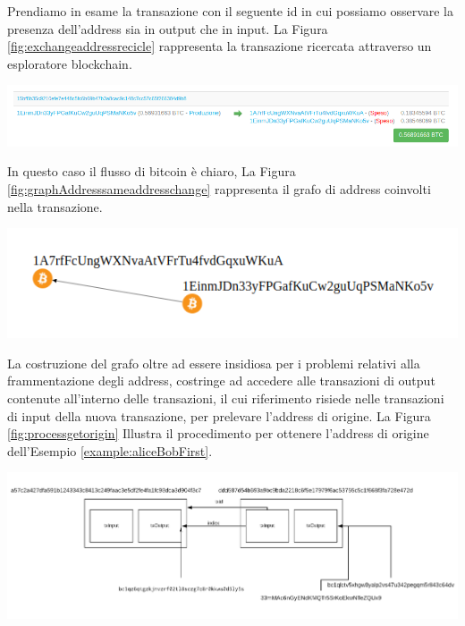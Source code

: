 \begin{example}
  Prendiamo in esame la transazione con il seguente id  in cui possiamo osservare la presenza dell’address  sia in output che in input.
  La Figura \ref{fig:exchangeaddressrecicle} rappresenta la transazione ricercata attraverso un esploratore blockchain.

  {\centering
  \vspace{15pt}
  \includegraphics[scale=0.35]{images/exampleWithGraph/exchange-tx-with-same-address.png}
  \vspace{5pt}
  \par}

  In questo caso il flusso di bitcoin è chiaro, La Figura \ref{fig:graphAddresssameaddresschange} rappresenta il grafo di address coinvolti nella transazione.

    {\centering
  \vspace{15pt}
  \includegraphics[scale=0.48]{images/exampleWithGraph/exchange-tx-with-same-address-graph.png}
  \vspace{10pt}
  \par}
\end{example}
La costruzione del grafo oltre ad essere insidiosa per i problemi relativi alla frammentazione degli address, costringe ad accedere alle transazioni di output contenute all’interno delle transazioni, il cui riferimento risiede nelle transazioni di input della nuova transazione, per prelevare l’address di origine.
La Figura \ref{fig:processgetorigin} Illustra il procedimento per ottenere l’address di origine dell’Esempio \ref{example:aliceBobFirst}.

{\vspace{15pt}
\includegraphics[scale=0.25]{images/howFindTheAddressTo.png}
\vspace{10pt}
\par}
